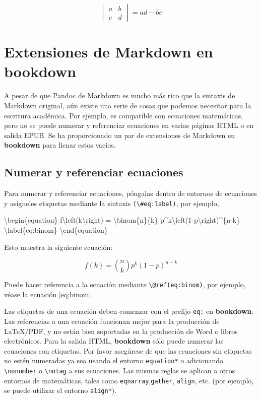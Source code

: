 \documentclass[12pt,]{krantz}
\makeatletter
\newenvironment{Shaded}{\begin{snugshade}}{\end{snugshade}}
\newcommand{\NormalTok}[1]{{#1}}
\newenvironment{kframe}{%
\medskip{}
\setlength{\fboxsep}{.8em}
 \def\at@end@of@kframe{}%
 \ifinner\ifhmode%
  \def\at@end@of@kframe{\end{minipage}}%
  \begin{minipage}{\columnwidth}%
 \fi\fi%
 \def\FrameCommand##1{\hskip\@totalleftmargin \hskip-\fboxsep
 \colorbox{shadecolor}{##1}\hskip-\fboxsep
     \hskip-\linewidth \hskip-\@totalleftmargin \hskip\columnwidth}%
 \MakeFramed {\advance\hsize-\width
   \@totalleftmargin\z@ \linewidth\hsize
   \@setminipage}}%
 {\par\unskip\endMakeFramed%
 \at@end@of@kframe}
\renewenvironment{Shaded}{\begin{kframe}}{\end{kframe}}
\theoremstyle{definition}
\theoremstyle{definition}
\theoremstyle{remark}
\let\BeginKnitrBlock\begin \let\EndKnitrBlock\end
\makeatother
\begin{document}
\[\begin{vmatrix}a & b\\
c & d
\end{vmatrix}=ad-bc\]

\section{Extensiones de Markdown en
bookdown}\label{extensiones-de-markdown-en-bookdown}

A pesar de que Pandoc de Markdown es mucho más rico que la sintaxis de
Markdown original, aún existe una serie de cosas que podemos necesitar
para la escritura académica. Por ejemplo, es compatible con ecuaciones
matemáticas, pero no se puede numerar y referenciar ecuaciones en varias
páginas HTML o en salida EPUB. Se ha proporcionado un par de extensiones
de Markdown en \textbf{bookdown} para llenar estos vacíos.

\subsection{Numerar y referenciar ecuaciones}\label{ecuaciones}

Para numerar y referenciar
ecuaciones, póngalas dentro de entornos de
ecuaciones y asígneles etiquetas mediante la sintaxis
\texttt{(\textbackslash{}\#eq:label)}, por ejemplo,

\begin{Shaded}
\begin{Highlighting}[]
\NormalTok{\textbackslash{}begin\{equation\} }
  \NormalTok{f\textbackslash{}left(k\textbackslash{}right) = \textbackslash{}binom\{n\}\{k\} p^k\textbackslash{}left(1-p\textbackslash{}right)^\{n-k\}}
  \NormalTok{\textbackslash{}label\{eq:binom\}}
\NormalTok{\textbackslash{}end\{equation\} }
\end{Highlighting}
\end{Shaded}

Esto muestra la siguiente ecuación:

\begin{equation}
f\left(k\right)=\binom{n}{k}p^k\left(1-p\right)^{n-k} \label{eq:binom}
\end{equation}

Puede hacer referencia a la ecuación mediante
\texttt{\textbackslash{}@ref(eq:binom)}, por ejemplo, véase la ecuación
\eqref{eq:binom}.

\BeginKnitrBlock{rmdcaution}
Las etiquetas de una ecuación deben comenzar con el prefijo \texttt{eq:}
en \textbf{bookdown}. Las referencias a una ecuación funcionan mejor
para la producción de LaTeX/PDF, y no están bien soportadas en la
producción de Word o libros electrónicos. Para la salida HTML,
\textbf{bookdown} sólo puede numerar las ecuaciones con etiquetas. Por
favor asegúrese de que las ecuaciones sin etiquetas no estén numeradas
ya sea usando el entorno \texttt{equation*} o adicionando
\texttt{\textbackslash{}nonumber} o \texttt{\textbackslash{}notag} a sus
ecuaciones. Las mismas reglas se aplican a otros entornos de
matemáticas, tales como \texttt{eqnarray},\texttt{gather},
\texttt{align}, etc. (por ejemplo, se puede utilizar el entorno
\texttt{align*}).
\EndKnitrBlock{rmdcaution}
\end{document}
